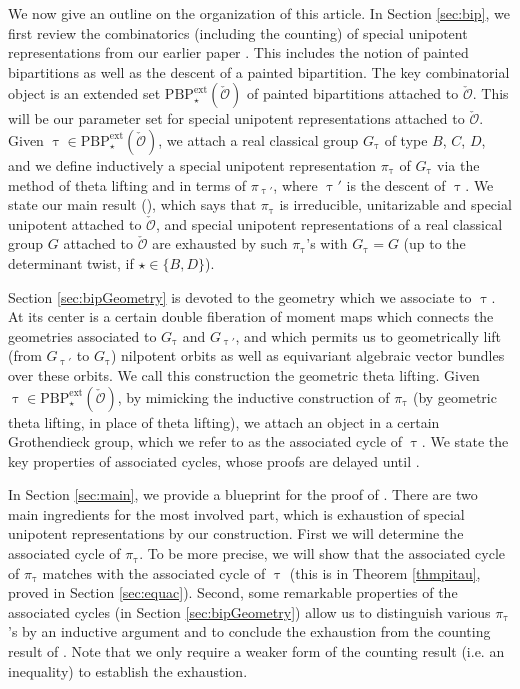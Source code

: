\documentclass[11pt,a4paper]{amsart}
\newcommand{\CO}{{\mathcal {O}}}
\numberwithin{equation}{section}
\theoremstyle{remark}
\def\PBPes{\mathrm{PBP}^{\mathrm{ext}}_{\star}}
\begin{document}
We now give an outline on the organization of this article. In Section \ref{sec:bip}, we first review the combinatorics (including the counting) of special unipotent representations from our earlier paper \cite{BMSZa}. This includes the notion of painted bipartitions as well as the descent of a painted bipartition. The key combinatorial object is an  extended set $\mathrm{\PBPes}(\check \CO)$ of painted bipartitions attached to $\check \CO$. This will be our parameter set for special unipotent representations attached to $\check \CO$. Given 
$\uptau \in \mathrm{\PBPes}(\check \CO)$, we attach a real classical group $G_{\uptau}$ of type $B$, $C$, $D$, and we define inductively a special unipotent representation $\pi_{\uptau}$ of $G_{\uptau}$ via the method of theta lifting and in terms of $\pi_{\uptau'}$, where $\uptau'$ is the descent of $\uptau $. We state our main result (), which says that $\pi_\uptau$ is irreducible, unitarizable and special unipotent attached to $\check \CO$, and special unipotent representations of a real classical group $G$ attached to $\check \CO$ 
are exhausted by such $\pi_\uptau$'s with $G_{\uptau}=G$ (up to the determinant twist, if $\star\in \{B,D\}$).  

Section \ref{sec:bipGeometry} is devoted to the geometry which we associate to $\uptau $. At its center is a certain double fiberation of moment maps which connects the geometries associated to
$G_{\uptau}$ and $G_{\uptau'}$, and which permits us to geometrically lift (from $G_{\uptau'}$ to $G_{\uptau}$) nilpotent orbits as well as equivariant algebraic vector bundles over these orbits. We call this construction the geometric theta lifting. Given 
$\uptau \in \mathrm{\PBPes}(\check \CO)$, by mimicking the inductive construction of $\pi_\uptau$ (by geometric theta lifting, in place of theta lifting), we attach an object in a certain Grothendieck group, which we refer to as the associated cycle of $\uptau$. We state the key properties of associated cycles, whose proofs are delayed until  . 

In Section \ref{sec:main}, we provide a blueprint for the proof of . There are two main ingredients for the most involved part, which is exhaustion of special unipotent representations by our construction. First we will determine the associated cycle of $\pi_{\uptau}$. To be more precise, we will show that the associated cycle of $\pi_{\uptau}$ matches with the associated cycle of $\uptau$ (this is in Theorem \ref{thmpitau}, proved in Section \ref{sec:equac}). 
Second, some remarkable properties of the associated cycles (in Section \ref{sec:bipGeometry}) allow us to distinguish various $\pi_{\uptau}$'s by an inductive argument and to conclude the exhaustion from the counting result of \cite{BMSZa}. Note that we only require a weaker form of the counting result (i.e. an inequality) to establish the exhaustion. 
\end{document}
